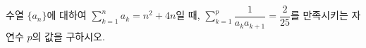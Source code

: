 \hspace*{2mm}\begin{minipage}[t]{\dimexpr\linewidth-2mm\relax}\vspace{0pt}
수열 $\{a_n\}$에 대하여 $\displaystyle\sum_{k=1}^{n}a_k=n^2+4n$일 때, $\displaystyle\sum_{k=1}^{p}\dfrac{1}{a_k a_{k+1}}=\dfrac{2}{25}$를 만족시키는 자연수 $p$의 값을 구하시오.\end{minipage}

